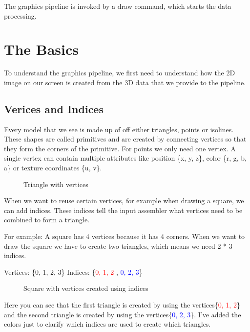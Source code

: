 \documentclass[12pt]{report} \usepackage{preamble}
\begin{document}
The graphics pipeline is invoked by a draw command, which starts the
data processing. \cite{build-pipeline}

\section{The Basics}

To understand the graphics pipeline, we first need to understand
how the 2D image on our screen is created from the 3D data that we
provide to the pipeline.

\subsection{Verices and Indices}

Every model that we see is made up of off either triangles, points or
isolines. These shapes are called primitives and are created by connecting
vertices so that they form the corners of the primitive. For points we
only need one vertex.
A single vertex can contain multiple attributes like position \{x, y, z\},
color \{r, g, b, a\} or texture coordinates \{u, v\}. \cite{vulkan-vertex-input}

\begin{figure}[hbtp]
	\centering 
	\caption{Triangle with vertices}
\end{figure} \FloatBarrier

When we want to reuse certain vertices, for example when
drawing a square, we can add indices.  These indices tell the
input assembler what vertices need to be combined to form a
triangle. \cite{vulkan-tutorial-index-buffer}

For example: A square has 4 vertices because it has 4 corners. When we want
to draw the square we have to create two triangles, which means we need 2 *
3 indices.

Vertices: \{0, 1, 2, 3\} Indices: \{\textcolor{red}{0, 1, 2} ,
\textcolor{blue}{0, 2, 3}\}

\begin{figure}[hbtp]
	\centering 
	\caption{Square
		with vertices created using indices}
\end{figure} \FloatBarrier

Here you can see that the first triangle is created by using the
vertices\{\textcolor{red}{0, 1, 2}\} and the second triangle is created by using
the vertices\{\textcolor{blue}{0, 2, 3}\}. I've added the colors just
to clarify which indices are used to create which triangles.
\end{document}
